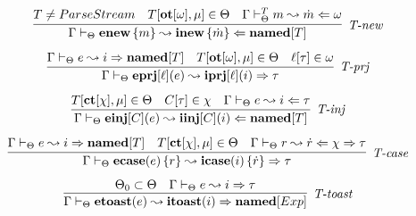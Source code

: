 \begin{figure}
\[\begin{array}{c}
\infer[\textit{T-new}]
	{\Gamma \vdash_\Theta \keyw{enew}\,\{ m \}  \leadsto \keyw{inew}\,\{\dot m\} \Leftarrow  \keyw{named}[T]}
	{ T\neq ParseStream & T[\keyw{ot}[\omega], \mu] \in \Theta & \Gamma \vdash_\Theta^T m \leadsto \dot m \Leftarrow \omega} \\[2ex]
\infer[\textit{T-prj}]
	{\Gamma \vdash_\Theta  \keyw{eprj}[\ell](e) \leadsto \keyw{iprj}[\ell](i) \Rightarrow \tau} 
	{\Gamma \vdash_\Theta e \leadsto i \Rightarrow \keyw{named}[T] & T[\keyw{ot}[\omega], \mu] \in \Theta & \ell[\tau] \in \omega}\\[2ex]
%
%	
	\infer[\textit{T-inj}]
	{\Gamma \vdash_\Theta  \keyw{einj}[C](e) \leadsto \keyw{iinj}[C](i) \Leftarrow \keyw{named}[T]} 
	{T[\keyw{ct}[\chi], \mu] \in \Theta & C[\tau] \in \chi &\Gamma \vdash_\Theta e \leadsto i \Leftarrow \tau }\\[2ex]

\infer[\textit{T-case}]
	{\Gamma \vdash_\Theta  \keyw{ecase}(e)\,\{r \}   \leadsto \keyw{icase}(i)\,\{ \dot{r} \} \Rightarrow \tau} 
	{\Gamma \vdash_\Theta e   \leadsto i \Rightarrow \keyw{named}[T] & T[\keyw{ct}[\chi], \mu] \in \Theta & \Gamma \vdash_\Theta r \leadsto \dot{r} \Leftarrow \chi \Rightarrow \tau}\\[2ex]
	
\infer[\textit{T-toast}]
        {\Gamma \vdash_\Theta \keyw{etoast}(e) \leadsto \keyw{itoast}(i) \Rightarrow \keyw{named}[Exp]}
	{\Theta_0 \subset \Theta & \Gamma \vdash_\Theta e \leadsto i \Rightarrow \tau } \\[2ex]


\end{array}\]
\end{figure}
